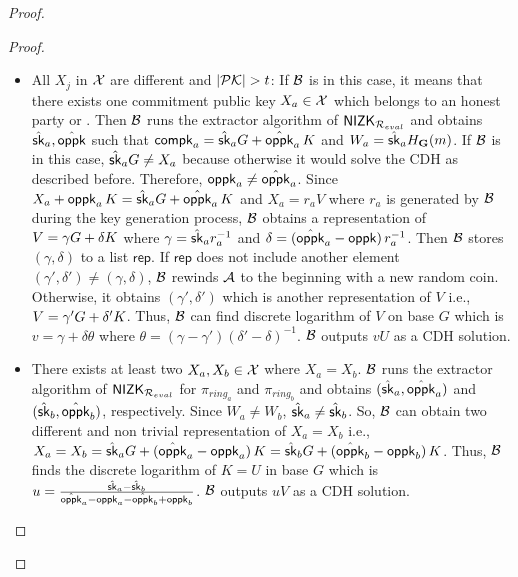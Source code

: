\begin{proof}
\begin{proof}
\begin{itemize}
			\item All $ X_j $ in $ {\mathcal{X}} $ are different and $ |{\mathcal{PK}}| > t $: If $ \mathcal{B} $ is in this case, it means that there exists one commitment public key $ X_a \in {\ensuremath{\mathcal{X}}} $ which belongs to an honest party or . Then $ \mathcal{B} $ runs the extractor algorithm of $ {\mathsf{NIZK}}_{\mathcal{R}_{eval}} $ and obtains $ \hat{\mathsf{sk}}_a, \hat{\mathsf{oppk}} $ such that $ \mathsf{compk}_a = \hat{\mathsf{sk}}_aG + \hat{\mathsf{oppk}}_a \,K $ and $ W_a = \hat{\mathsf{sk}}_a H_{\mathbf{G}}(m) $.  If $ \mathcal{B} $ is in this case, $ \hat{\mathsf{sk}}_aG\neq X_a $ because otherwise it would solve the CDH as described before. Therefore, $ \mathsf{oppk}_a \neq \hat{\mathsf{oppk}}_a $. Since $ X_a + \mathsf{oppk}_a \, K = \hat{\mathsf{sk}}_aG + \hat{\mathsf{oppk}}_a \,K  $ and $ X_a = r_aV $ where $ r_a $ is generated by $ \mathcal{B} $ during the key generation process, $ \mathcal{B} $ obtains a representation of $ V = \gamma G + \delta K $ where $ \gamma = \hat{\mathsf{sk}}_ar^{-1}_a  $ and $ \delta = (\hat{\mathsf{oppk}}_a -\mathsf{oppk})\,r_a^{-1} $. Then $ \mathcal{B} $ stores $ (\gamma, \delta) $ to a list $ \mathsf{rep} $. If $ \mathsf{rep} $ does not include another element $ (\gamma', \delta')  \neq (\gamma, \delta) $, $ \mathcal{B} $ rewinds $ \mathcal{A} $ to the beginning with a new random coin.  Otherwise, it obtains $ (\gamma', \delta') $ which is another representation of $ V $ i.e., $ V = \gamma' G + \delta' K $. Thus, $ \mathcal{B} $ can find discrete logarithm of $ V $ on base $ G $ which is $ v = \gamma + \delta \theta $ where $ \theta = (\gamma - \gamma')(\delta' - \delta)^{-1} $. $ \mathcal{B} $ outputs $ vU $ as a CDH solution.
			\item  There exists at least two $ X_a,X_b \in {\ensuremath{\mathcal{X}}} $ where $ X_a = X_b $. $ \mathcal{B} $ runs the extractor algorithm of $ {\mathsf{NIZK}}_{\mathcal{R}_{eval}} $ for $ \pi_{ring_a} $ and $ \pi_{ring_b} $ and obtains $(\hat{\mathsf{sk}}_a,\hat{\mathsf{oppk}}_a )$ and $(\hat{\mathsf{sk}}_b,\hat{\mathsf{oppk}}_b )$, respectively. Since $ W_a \neq W_b $, $ \hat{\mathsf{sk}}_a \neq \hat{\mathsf{sk}}_b $. So, $ \mathcal{B} $ can obtain two different and non trivial representation of $ X_a = X_b $ i.e., $ X_a = X_b = \hat{\mathsf{sk}}_aG + (\hat{\mathsf{oppk}}_a - \mathsf{oppk}_a) \, K = \hat{\mathsf{sk}}_bG + (\hat{\mathsf{oppk}}_b - \mathsf{oppk}_b) \, K $. Thus, $ \mathcal{B} $ finds the discrete logarithm of $ K = U $ in base $ G $ which is $ u = \frac{\hat{\mathsf{sk}}_a - \hat{\mathsf{sk}}_b}{\hat{\mathsf{oppk}}_a -\mathsf{oppk}_a -\hat{\mathsf{oppk}}_b + \mathsf{oppk}_b} $. $ \mathcal{B} $ outputs $ uV $ as a CDH solution.
			\end{itemize}
			

\end{proof}
\end{proof}
